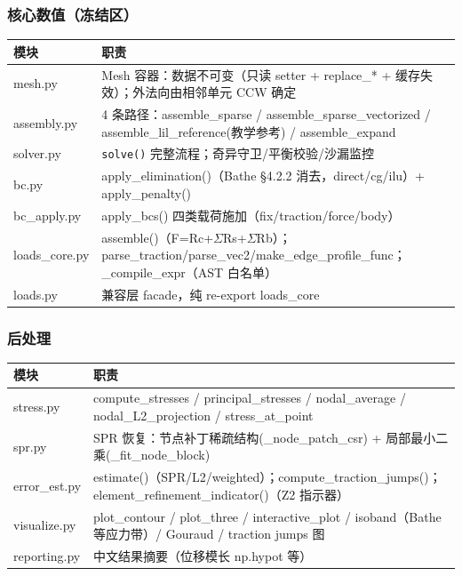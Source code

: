 \documentclass[12pt,a4paper]{ctexart}
\newcommand{\fem}{\Verb}
\begin{document}
\subsubsection{核心数值（冻结区）}

\begin{longtable}{p{4.0cm}p{11.4cm}}
\toprule
\textbf{模块} & \textbf{职责} \\
\midrule
mesh.py & Mesh 容器：数据不可变（只读 setter + replace\_* + 缓存失效）；外法向由相邻单元 CCW 确定 \\
assembly.py & 4 条路径：assemble\_sparse / assemble\_sparse\_vectorized / assemble\_lil\_reference(教学参考) / assemble\_expand \\
solver.py & \fem|solve()| 完整流程；奇异守卫/平衡校验/沙漏监控 \\
bc.py & apply\_elimination()（Bathe §4.2.2 消去，direct/cg/ilu）+ apply\_penalty() \\
bc\_apply.py & apply\_bcs() 四类载荷施加（fix/traction/force/body） \\
loads\_core.py & assemble()（F=Rc+$\Sigma$Rs+$\Sigma$Rb）；parse\_traction/parse\_vec2/make\_edge\_profile\_func；\_compile\_expr（AST 白名单） \\
loads.py & 兼容层 facade，纯 re-export loads\_core \\
\bottomrule
\end{longtable}

\subsubsection{后处理}

\begin{longtable}{p{4.0cm}p{11.4cm}}
\toprule
\textbf{模块} & \textbf{职责} \\
\midrule
stress.py & compute\_stresses / principal\_stresses / nodal\_average / nodal\_L2\_projection / stress\_at\_point \\
spr.py & SPR 恢复：节点补丁稀疏结构(\_node\_patch\_csr) + 局部最小二乘(\_fit\_node\_block) \\
error\_est.py & estimate()（SPR/L2/weighted）；compute\_traction\_jumps()；element\_refinement\_indicator()（Z2 指示器） \\
visualize.py & plot\_contour / plot\_three / interactive\_plot / isoband（Bathe 等应力带）/ Gouraud / traction jumps 图 \\
reporting.py & 中文结果摘要（位移模长 np.hypot 等） \\
\bottomrule
\end{longtable}
\end{document}
